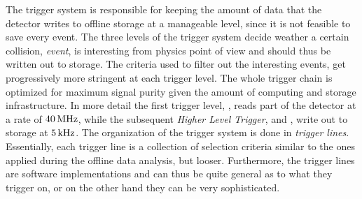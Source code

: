 The trigger system is responsible for keeping the amount of data that the detector writes to offline storage
at a manageable level, since it is not feasible to save every event. The three levels of the \lhcb trigger system
decide weather a certain collision, {\it event}, is interesting from physics point
of view and should thus be written out to storage. The criteria used to filter out the interesting events, get
progressively more stringent at each trigger level. The whole trigger chain is optimized for maximum
signal purity given the amount of computing and storage infrastructure. In more detail the first trigger
level, \lzero, reads part of the detector at a rate of $40{\rm \,MHz}$, while the subsequent {\it Higher Level Trigger},
\hltone and \hlttwo, write out to storage at $5{\rm \,kHz}$. The organization of the trigger system is done in
{\it trigger lines}. Essentially, each trigger line is a collection of selection criteria similar to the
ones applied during the offline data analysis, but looser. Furthermore, the trigger lines are software
implementations and can thus be quite general as to what they trigger on, or on the other hand they can
be very sophisticated.

